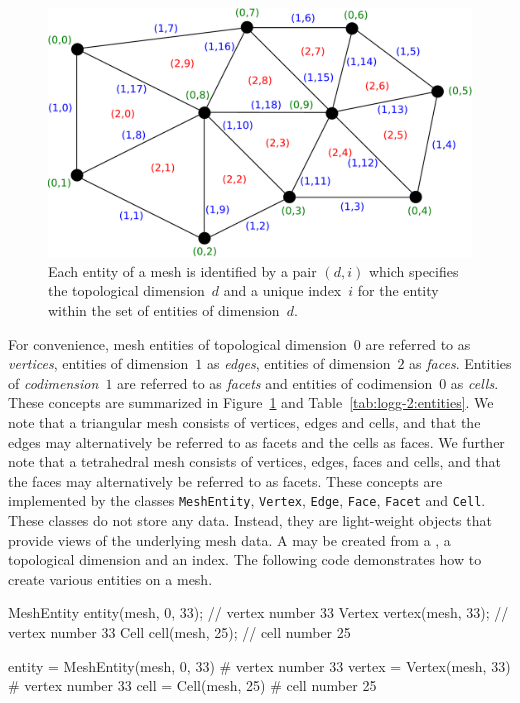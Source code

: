 \begin{figure}
  \begin{center}
    \includegraphics[width=\largefig]{chapters/logg-2/pdf/mesh-p1-entities.pdf}
    \caption{Each entity of a mesh is identified by a pair $(d, i)$
      which specifies the topological dimension~$d$ and a unique
      index~$i$ for the entity within the set of entities of
      dimension~$d$.}
    \label{fig:logg-2:entities}
  \end{center}
\end{figure}

For convenience, mesh entities of topological dimension~$0$ are
referred to as \emph{vertices}, entities of dimension~$1$ as
\emph{edges}, entities of dimension~$2$ as \emph{faces}. Entities of
\emph{codimension}~$1$ are referred to as \emph{facets} and entities
of codimension~$0$ as \emph{cells}. These concepts are summarized in
Figure~\ref{fig:logg-2:entities} and
Table~\ref{tab:logg-2:entities}. We note that a triangular mesh
consists of vertices, edges and cells, and that the edges may
alternatively be referred to as facets and the cells as faces. We
further note that a tetrahedral mesh consists of vertices, edges,
faces and cells, and that the faces may alternatively be referred to
as facets. These concepts are implemented by the classes
\texttt{MeshEntity}, \texttt{Vertex}, \texttt{Edge}, \texttt{Face},
\texttt{Facet} and \texttt{Cell}. These classes do not store any
data. Instead, they are light-weight objects that provide views of the
underlying mesh data. A  may be created from a
, a topological dimension and an index. The following code
demonstrates how to create various entities on a mesh.
\begin{c++}
MeshEntity entity(mesh, 0, 33); // vertex number 33
Vertex vertex(mesh, 33);        // vertex number 33
Cell cell(mesh, 25);            // cell number 25
\end{c++}
\begin{python}
entity = MeshEntity(mesh, 0, 33) # vertex number 33
vertex = Vertex(mesh, 33)        # vertex number 33
cell = Cell(mesh, 25)            # cell number 25
\end{python}

